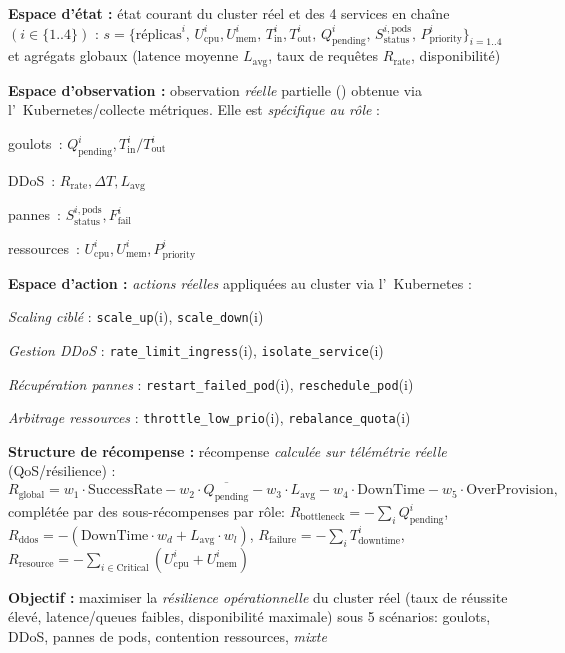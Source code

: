 \begin{enumerate*}[label={\roman*)}, itemjoin={;\quad}]
  \item \textbf{Espace d'état :} état courant du cluster réel et des 4 services en chaîne \((i \in \{1..4\})\) :
  \(
  s = \{\text{réplicas}^i,\,
  U_{\text{cpu}}^i, U_{\text{mem}}^i,\,
  T_{\text{in}}^i, T_{\text{out}}^i,\,
  Q_{\text{pending}}^i,\,
  S_{\text{status}}^{i,\text{pods}},\,
  P_{\text{priority}}^i\}_{i=1..4}
  \)
  et agrégats globaux (latence moyenne \(L_{\text{avg}}\), taux de requêtes \(R_{\text{rate}}\), disponibilité)
  \item \textbf{Espace d'observation :} observation \emph{réelle} partielle () obtenue via l'~Kubernetes/collecte métriques. Elle est \emph{spécifique au rôle} :
  \begin{enumerate*}[label={}, itemjoin={;\,}]
    \item goulots~: \(Q_{\text{pending}}^i, T_{\text{in}}^i/T_{\text{out}}^i\)
    \item DDoS~: \(R_{\text{rate}}, \Delta T, L_{\text{avg}}\)
    \item pannes~: \(S_{\text{status}}^{i,\text{pods}}, F_{\text{fail}}^i\)
    \item ressources~: \(U_{\text{cpu}}^i, U_{\text{mem}}^i, P_{\text{priority}}^i\)
  \end{enumerate*}
  \item \textbf{Espace d'action :} \emph{actions réelles} appliquées au cluster via l'~Kubernetes :
  \begin{enumerate*}[label={\roman*)}, itemjoin={;\quad}]
    \item \emph{Scaling ciblé} : \texttt{scale\_up}(i), \texttt{scale\_down}(i)
    \item \emph{Gestion DDoS} : \texttt{rate\_limit\_ingress}(i), \texttt{isolate\_service}(i)
    \item \emph{Récupération pannes} : \texttt{restart\_failed\_pod}(i), \texttt{reschedule\_pod}(i)
    \item \emph{Arbitrage ressources} : \texttt{throttle\_low\_prio}(i), \texttt{rebalance\_quota}(i)
  \end{enumerate*}
  \item \textbf{Structure de récompense :} récompense \emph{calculée sur télémétrie réelle} (QoS/résilience) :
  \[
    R_{\text{global}}=
    w_1\cdot\text{SuccessRate}
    -w_2\cdot\overline{Q_{\text{pending}}}
    -w_3\cdot L_{\text{avg}}
    -w_4\cdot \text{DownTime}
    -w_5\cdot \text{OverProvision},
  \]
  complétée par des sous-récompenses par rôle:
  \(R_{\text{bottleneck}}=-\sum_i Q_{\text{pending}}^i\),
  \(R_{\text{ddos}}=-(\text{DownTime}\cdot w_d+L_{\text{avg}}\cdot w_l)\),
  \(R_{\text{failure}}=-\sum_i T_{\text{downtime}}^i\),
  \(R_{\text{resource}}=-\sum_{i\in\text{Critical}}(U_{\text{cpu}}^i+U_{\text{mem}}^i)\)
  \item \textbf{Objectif :} maximiser la \emph{résilience opérationnelle} du cluster réel (taux de réussite élevé, latence/queues faibles, disponibilité maximale) sous 5 scénarios: goulots, DDoS, pannes de pods, contention ressources, \emph{mixte}
\end{enumerate*}

